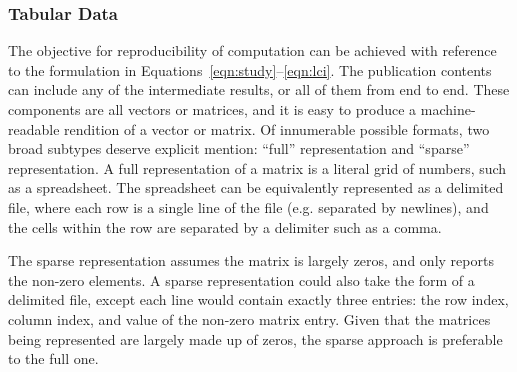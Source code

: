 


\subsubsection{Tabular Data}

The objective for reproducibility of computation can be achieved with reference to the formulation in Equations~\ref{eqn:study}--\ref{eqn:lci}.  The publication contents can include any of the intermediate results, or all of them from end to end.  These components are all vectors or matrices, and it is easy to produce a machine-readable rendition of a vector or matrix.  Of innumerable possible formats, two broad subtypes deserve explicit mention: ``full'' representation and ``sparse'' representation.  A full representation of a matrix is a literal grid of numbers, such as a spreadsheet.  The spreadsheet can be equivalently represented as a delimited file, where each row is a single line of the file (e.g. separated by newlines), and the cells within the row are separated by a delimiter such as a comma.

The sparse representation assumes the matrix is largely zeros, and only reports the non-zero elements.  A sparse representation could also take the form of a delimited file, except each line would contain exactly three entries: the row index, column index, and value of the non-zero matrix entry.  Given that the matrices being represented are largely made up of zeros, the sparse approach is preferable to the full one.  %

